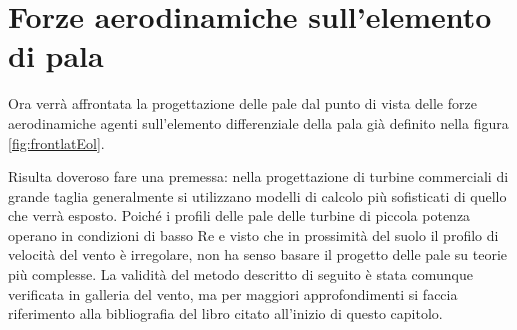 \section{Forze aerodinamiche sull'elemento di pala}
Ora verrà affrontata la progettazione delle pale dal punto di vista delle forze aerodinamiche agenti sull'elemento differenziale della pala già definito nella figura \ref{fig:frontlatEol}. 

Risulta doveroso fare una premessa: nella progettazione di turbine commerciali di grande taglia generalmente si utilizzano modelli di calcolo più sofisticati di quello che verrà esposto.
Poiché i profili delle pale delle turbine di piccola potenza operano in condizioni di basso Re e visto che in prossimità del suolo il profilo di velocità del vento è irregolare, non ha senso basare il progetto delle pale su teorie più complesse. La validità del metodo descritto di seguito è stata comunque verificata in galleria del vento, ma per maggiori approfondimenti si faccia riferimento alla bibliografia del libro citato all'inizio di questo capitolo.

